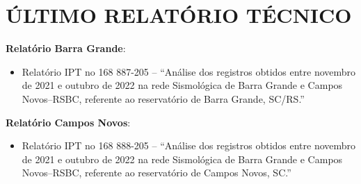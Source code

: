 \section{ÚLTIMO RELATÓRIO TÉCNICO}
\label{section:ultimo_relatorio}
\textbf{Relatório Barra Grande}:

\begin{itemize}
\item Relatório IPT no 168 887-205 – “Análise dos registros obtidos entre novembro de 2021 e outubro de 2022 na rede Sismológica de Barra Grande e Campos Novos–RSBC, referente ao reservatório de Barra Grande, SC/RS.”
\end{itemize}

\textbf{Relatório Campos Novos}:
\begin{itemize}
    \item Relatório IPT no 168 888-205 – “Análise dos registros obtidos entre novembro de 2021 e outubro de 2022 na rede Sismológica de Barra Grande e Campos Novos–RSBC, referente ao reservatório de Campos Novos, SC.”
\end{itemize}
